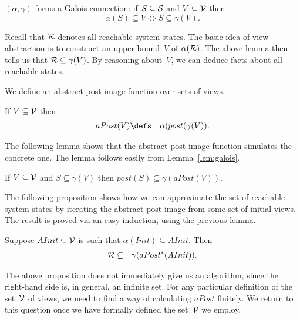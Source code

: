 

\begin{lemma}
\label{lem:galois}
$(\alpha, \gamma)$ forms a Galois connection: if $S \subseteq \S$ and $V
  \subseteq \V$ then 
\[
\alpha(S) \subseteq V \iff S \subseteq \gamma(V).
\]
\end{lemma}
%


Recall that $\R$ denotes all reachable system states.  The basic idea of view
abstraction is to construct an upper bound~$V$ of $\alpha(\R)$.  The above
lemma then tells us that $\R \subseteq \gamma(V)$.  By reasoning about~$V$, we
can deduce facts about all reachable states. 

We define an abstract post-image function over sets of views.
%
\begin{definition}
If $V \subseteq \V$ then 
\begin{eqnarray*}
aPost(V) & \defs & \alpha(post(\gamma(V)).
\end{eqnarray*}
\end{definition}
%
The following lemma shows that the abstract post-image function simulates the
concrete one.  The lemma follows easily from  Lemma~\ref{lem:galois}.
%
\begin{lemma}
If $V \subseteq \V$ and $S \subseteq \gamma(V)$ then 
$post(S) \subseteq \gamma(aPost(V))$.
\end{lemma}
%
The following proposition shows how we can approximate the set of reachable
system states by iterating the abstract post-image from some set of initial
views.  The result is proved via an easy induction, using the previous lemma.
%
\begin{prop}
\label{prop:reachable}
Suppose $AInit \subseteq \V$ is such that $\alpha(Init) \subseteq AInit$.  Then
\begin{eqnarray*}
\R & \subseteq & \gamma (aPost^*(AInit)).
\end{eqnarray*}
\end{prop}

The above proposition does not immediately give us an algorithm, since the
right-hand side is, in general, an infinite set.  For any particular definition
of the set~$\V$ of views, we need to find a way of calculating $aPost$
finitely.  We return to this question once we have formally defined the
set~$\V$ we employ. 

